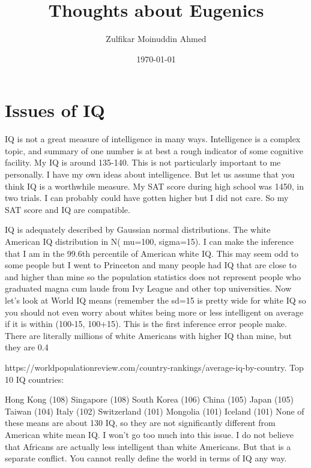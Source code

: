 \documentclass{amsart}
\title{Thoughts about Eugenics}
\author{Zulfikar Moinuddin Ahmed}
\date{\today}
\begin{document}
\maketitle

\section{Issues of IQ}

IQ is not a great measure of intelligence in many ways.  Intelligence is a complex topic, and summary of one number is at best a rough indicator of some cognitive facility.  My IQ is around 135-140.  This is not particularly important to me personally.  I have my own ideas about intelligence.  But let us assume that you think IQ is a worthwhile measure.  My SAT score during high school was 1450, in two trials.  I can probably could have gotten higher but I did not care.  So my SAT score and IQ are compatible.  

IQ is adequately described by Gaussian normal distributions.  The white American IQ distribution in N( mu=100, sigma=15).  I can make the inference that I am in the 99.6th percentile of American white IQ.  This may seem odd to some people but I went to Princeton and many people had IQ that are close to and higher than mine so the population statistics does not represent people who graduated magna cum laude from Ivy League and other top universities.  Now let's look at World IQ means (remember the sd=15 is pretty wide for white IQ so you should not even worry about whites being more or less intelligent on average if it is within (100-15, 100+15).  This is the first inference error people make.  There are literally millions of white Americans with higher IQ than mine, but they are 0.4%

https://worldpopulationreview.com/country-rankings/average-iq-by-country.  Top 10 IQ countries:

Hong Kong (108)
Singapore (108)
South Korea (106)
China (105)
Japan (105)
Taiwan (104)
Italy (102)
Switzerland (101)
Mongolia (101)
Iceland (101)
None of these means are about 130 IQ, so they are not significantly different from American white mean IQ.  I won't go too much into this issue.  I do not believe that Africans are actually less intelligent than white Americans.  But that is a separate conflict.  You cannot really define the world in terms of IQ any way.
\end{document}
